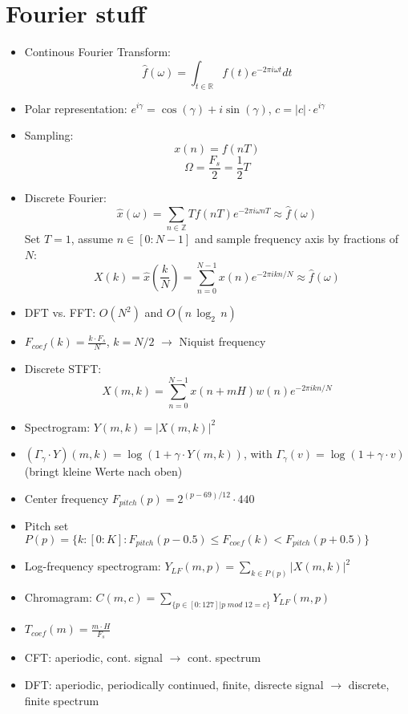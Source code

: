 \documentclass{scrartcl}
\begin{document}
\section{Fourier stuff}
\begin{itemize}
    \item
        Continous Fourier Transform:
				\marginpar{\Huge ! \hfill}
        $$\hat{f}(\omega) = \int_{t \in \mathbb{R}} f(t) e^{-2 \pi i \omega t} dt$$
    \item
        Polar representation:
        $e^{i \gamma} = \cos(\gamma) + i \sin(\gamma)$, $c = |c| \cdot e^{i \gamma}$\\
    \item
        Sampling:
        $$x(n) = f(nT)$$
        $$\Omega = \frac{F_s}{2} = \frac{1}{2} T$$ 
    \item
        Discrete Fourier:
        $$ \hat{x}(\omega) = \sum_{n \in \mathbb{Z}} T f(nT) e^{-2 \pi i \omega n T} \approx \hat{f}(\omega) $$
        Set $T=1$, assume $n \in [0:N-1]$ and sample frequency axis by fractions of $N$:
        $$ X(k) = \hat{x}(\frac{k}{N}) =  \sum_{n = 0}^{N-1} x(n) e^{-2 \pi i k n/N} \approx \hat{f}(\omega) $$
    \item 
        DFT vs. FFT: $O(N^2)$ and $O(n \, \log_2 \, n)$
    \item
        $F_{coef}(k) = \frac{k \cdot F_s}{N}$, $k=N/2$ $\rightarrow$ Niquist frequency
			\marginpar{\Huge ! \hfill}
    \item
        Discrete STFT:
        $$X(m, k) = \sum_{n=0}^{N-1} x(n+mH) w(n) e^{-2 \pi i k n/N}$$
    \item
        Spectrogram: $ Y(m,k) = |X(m,k)|^2$
    \item
        $(\Gamma_{\gamma} \cdot Y)(m, k) = \log(1 + \gamma \cdot Y(m,k))$, with $\Gamma_{\gamma}(v) = \log(1 + \gamma \cdot v)$ (bringt kleine Werte nach oben)
    \item
        Center frequency $F_{pitch}(p) = 2^{(p-69)/12} \cdot 440$
    \item
        Pitch set $P(p) = \{k: [0:K]: F_{pitch}(p-0.5) \leq F_{coef}(k) < F_{pitch}(p+0.5)\}$
    \item
        Log-frequency spectrogram: $Y_{LF}(m,p) = \sum_{k \in P(p)} |X(m,k)|^2$
    \item
        Chromagram: $C(m,c) = \sum_{\{ p \in [0:127] | p \; mod \; 12 = c\}} Y_{LF}(m,p)$
    \item
        $T_{coef}(m) = \frac{m \cdot H}{F_s}$\\
			\marginpar{\Huge ! \hfill}

    \item
        CFT: aperiodic, cont. signal $\rightarrow$ cont. spectrum
    \item
        DFT: aperiodic, periodically continued, finite, disrecte signal $\rightarrow$ discrete, finite spectrum
\end{itemize}
\end{document}
